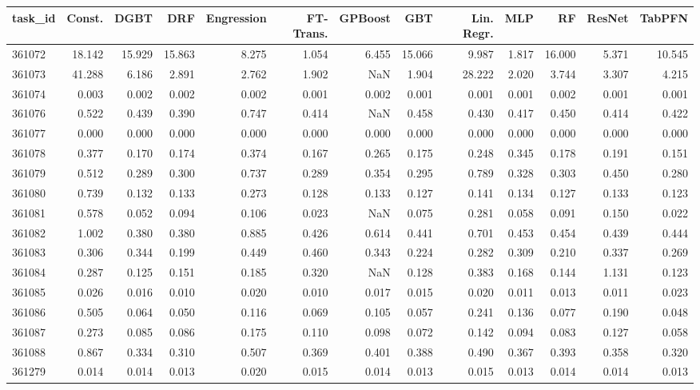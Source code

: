 \begin{tabular}{lrrrrrrrrrrrr}
\toprule
task\_id & Const. & DGBT & DRF & Engression & FT-Trans. & GPBoost & GBT & Lin. Regr. & MLP & RF & ResNet & TabPFN \\
\midrule
361072 & 18.142 & 15.929 & 15.863 & 8.275 & 1.054 & 6.455 & 15.066 & 9.987 & 1.817 & 16.000 & 5.371 & 10.545 \\
361073 & 41.288 & 6.186 & 2.891 & 2.762 & 1.902 & NaN & 1.904 & 28.222 & 2.020 & 3.744 & 3.307 & 4.215 \\
361074 & 0.003 & 0.002 & 0.002 & 0.002 & 0.001 & 0.002 & 0.001 & 0.001 & 0.001 & 0.002 & 0.001 & 0.001 \\
361076 & 0.522 & 0.439 & 0.390 & 0.747 & 0.414 & NaN & 0.458 & 0.430 & 0.417 & 0.450 & 0.414 & 0.422 \\
361077 & 0.000 & 0.000 & 0.000 & 0.000 & 0.000 & 0.000 & 0.000 & 0.000 & 0.000 & 0.000 & 0.000 & 0.000 \\
361078 & 0.377 & 0.170 & 0.174 & 0.374 & 0.167 & 0.265 & 0.175 & 0.248 & 0.345 & 0.178 & 0.191 & 0.151 \\
361079 & 0.512 & 0.289 & 0.300 & 0.737 & 0.289 & 0.354 & 0.295 & 0.789 & 0.328 & 0.303 & 0.450 & 0.280 \\
361080 & 0.739 & 0.132 & 0.133 & 0.273 & 0.128 & 0.133 & 0.127 & 0.141 & 0.134 & 0.127 & 0.133 & 0.123 \\
361081 & 0.578 & 0.052 & 0.094 & 0.106 & 0.023 & NaN & 0.075 & 0.281 & 0.058 & 0.091 & 0.150 & 0.022 \\
361082 & 1.002 & 0.380 & 0.380 & 0.885 & 0.426 & 0.614 & 0.441 & 0.701 & 0.453 & 0.454 & 0.439 & 0.444 \\
361083 & 0.306 & 0.344 & 0.199 & 0.449 & 0.460 & 0.343 & 0.224 & 0.282 & 0.309 & 0.210 & 0.337 & 0.269 \\
361084 & 0.287 & 0.125 & 0.151 & 0.185 & 0.320 & NaN & 0.128 & 0.383 & 0.168 & 0.144 & 1.131 & 0.123 \\
361085 & 0.026 & 0.016 & 0.010 & 0.020 & 0.010 & 0.017 & 0.015 & 0.020 & 0.011 & 0.013 & 0.011 & 0.023 \\
361086 & 0.505 & 0.064 & 0.050 & 0.116 & 0.069 & 0.105 & 0.057 & 0.241 & 0.136 & 0.077 & 0.190 & 0.048 \\
361087 & 0.273 & 0.085 & 0.086 & 0.175 & 0.110 & 0.098 & 0.072 & 0.142 & 0.094 & 0.083 & 0.127 & 0.058 \\
361088 & 0.867 & 0.334 & 0.310 & 0.507 & 0.369 & 0.401 & 0.388 & 0.490 & 0.367 & 0.393 & 0.358 & 0.320 \\
361279 & 0.014 & 0.014 & 0.013 & 0.020 & 0.015 & 0.014 & 0.013 & 0.015 & 0.013 & 0.014 & 0.014 & 0.013 \\

\end{tabular}
